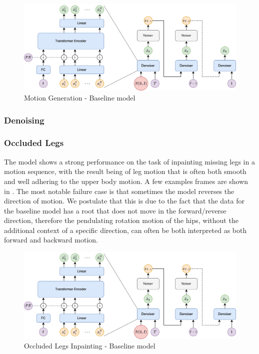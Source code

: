 \begin{figure}[!ht]
    \centering
    \includegraphics[width=1\textwidth]{Figures/diffusion/Network_diagram.png}
    \caption{Motion Generation - Baseline model}
    \label{fig:baseline_generation}
\end{figure}

\subsubsection{Denoising}

\subsubsection{Occluded Legs}
The model shows a strong performance on the task of inpainting missing legs in a motion sequence, with the result being of leg motion that is often both smooth and well adhering to the upper body motion. A few examples frames are shown in . 
The most notable failure case is that sometimes the model reverses the direction of motion. We postulate that this is due to the fact that the data for the baseline model has a root that does not move in the forward/reverse direction, therefore the pendulating rotation motion of the hips, without the additional context of a specific direction, can often be both interpreted as both forward and backward motion.

\begin{figure}[!ht]
    \centering
    \includegraphics[width=1\textwidth]{Figures/diffusion/Network_diagram.png}
    \caption{Occluded Legs Inpainting - Baseline model}
    \label{fig:baseline_occluded_legs}
\end{figure}


